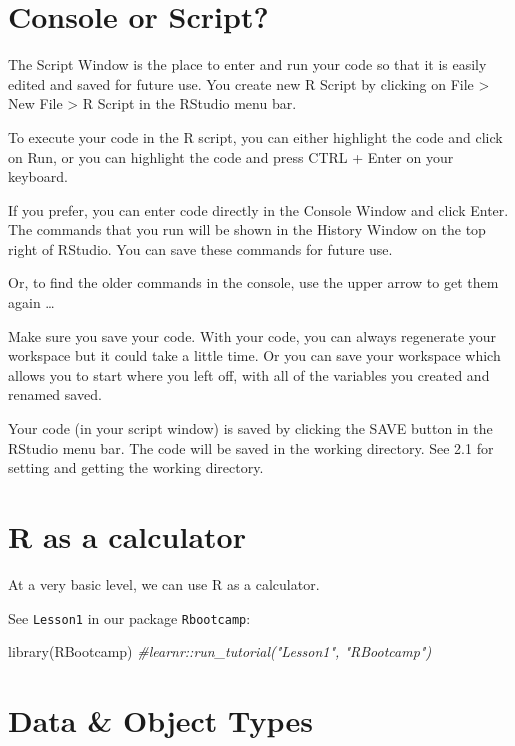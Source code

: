 \documentclass[
]{book}
\newenvironment{Shaded}{\begin{snugshade}}{\end{snugshade}}
\newcommand{\CommentTok}[1]{\textcolor[rgb]{0.56,0.35,0.01}{\textit{#1}}}
\newcommand{\FunctionTok}[1]{\textcolor[rgb]{0.00,0.00,0.00}{#1}}
\newcommand{\NormalTok}[1]{#1}
\begin{document}
\hypertarget{console-or-script}{%
\section{Console or Script?}\label{console-or-script}}

The Script Window is the place to enter and run your code so that it is easily edited and saved for future use. You create new R Script by clicking on File \textgreater{} New File \textgreater{} R Script in the RStudio menu bar.

To execute your code in the R script, you can either highlight the code and click on Run, or you can highlight the code and press CTRL + Enter on your keyboard.

If you prefer, you can enter code directly in the Console Window and click Enter. The commands that you run will be shown in the History Window on the top right of RStudio. You can save these commands for future use.

Or, to find the older commands in the console, use the upper arrow to get them again \ldots{}

Make sure you save your code. With your code, you can always regenerate your workspace but it could take a little time. Or you can save your workspace which allows you to start where you left off, with all of the variables you created and renamed saved.

Your code (in your script window) is saved by clicking the SAVE button in the RStudio menu bar. The code will be saved in the working directory. See 2.1 for setting and getting the working directory.

\hypertarget{r-as-a-calculator}{%
\section{R as a calculator}\label{r-as-a-calculator}}

At a very basic level, we can use R as a calculator.

See \texttt{Lesson1} in our package \texttt{Rbootcamp}:

\begin{Shaded}
\begin{Highlighting}[]
\FunctionTok{library}\NormalTok{(RBootcamp)}
\CommentTok{\#learnr::run\_tutorial("Lesson1", "RBootcamp")}
\end{Highlighting}
\end{Shaded}

\hypertarget{data-object-types}{%
\section{Data \& Object Types}\label{data-object-types}}
\end{document}
